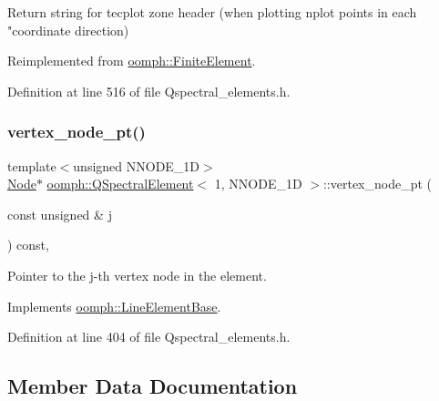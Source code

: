 Return string for tecplot zone header (when plotting nplot points in each "coordinate direction) 



Reimplemented from \hyperlink{classoomph_1_1FiniteElement_a3193df31f9ce38e0609d17a8ffb386c6}{oomph\+::\+Finite\+Element}.



Definition at line 516 of file Qspectral\+\_\+elements.\+h.

\mbox{\label{classoomph_1_1QSpectralElement_3_011_00_01NNODE__1D_01_4_a6106b1fc74eeab6848f3b03dba512f09}} 
\subsubsection{\texorpdfstring{vertex\+\_\+node\+\_\+pt()}{vertex\_node\_pt()}}
{\footnotesize\ttfamily template$<$unsigned N\+N\+O\+D\+E\+\_\+1D$>$ \\
\hyperlink{classoomph_1_1Node}{Node}$\ast$ \hyperlink{classoomph_1_1QSpectralElement}{oomph\+::\+Q\+Spectral\+Element}$<$ 1, N\+N\+O\+D\+E\+\_\+1D $>$\+::vertex\+\_\+node\+\_\+pt (\begin{DoxyParamCaption}\item[{const unsigned \&}]{j }\end{DoxyParamCaption}) const\hspace{0.3cm}{\ttfamily [inline]}, {\ttfamily [virtual]}}



Pointer to the j-\/th vertex node in the element. 



Implements \hyperlink{classoomph_1_1LineElementBase_ab878e4c4276da4cefa4302cff8a7e6f8}{oomph\+::\+Line\+Element\+Base}.



Definition at line 404 of file Qspectral\+\_\+elements.\+h.



\subsection{Member Data Documentation}
\mbox{\label{classoomph_1_1QSpectralElement_3_011_00_01NNODE__1D_01_4_a0e7111fe24ec8864f7de58997ec74f03}} 

